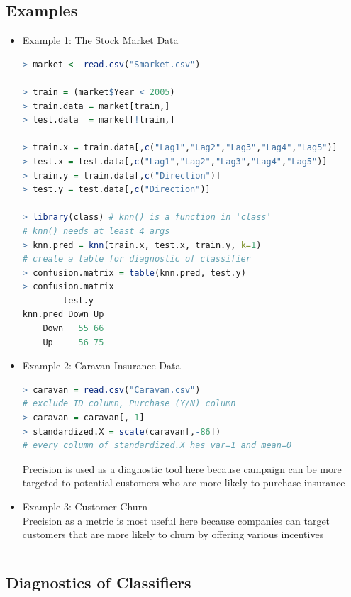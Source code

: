 \documentclass{article}
\begin{document}
\subsection{Examples}
\begin{itemize}
    \item Example 1: The Stock Market Data
\begin{lstlisting}[language=R]
> market <- read.csv("Smarket.csv")

> train = (market$Year < 2005)
> train.data = market[train,]
> test.data  = market[!train,]

> train.x = train.data[,c("Lag1","Lag2","Lag3","Lag4","Lag5")]
> test.x = test.data[,c("Lag1","Lag2","Lag3","Lag4","Lag5")]
> train.y = train.data[,c("Direction")]
> test.y = test.data[,c("Direction")]

> library(class) # knn() is a function in 'class'
# knn() needs at least 4 args
> knn.pred = knn(train.x, test.x, train.y, k=1)
# create a table for diagnostic of classifier
> confusion.matrix = table(knn.pred, test.y)
> confusion.matrix
        test.y
knn.pred Down Up
    Down   55 66
    Up     56 75
\end{lstlisting}
    \item Example 2: Caravan Insurance Data
\begin{lstlisting}[language=R]
> caravan = read.csv("Caravan.csv")
# exclude ID column, Purchase (Y/N) column
> caravan = caravan[,-1]
> standardized.X = scale(caravan[,-86])
# every column of standardized.X has var=1 and mean=0
\end{lstlisting}
Precision is used as a diagnostic tool here because campaign can be more targeted to potential customers who are more likely to purchase insurance
\item Example 3: Customer Churn\\
Precision as a metric is most useful here because companies can target customers that are more likely to churn by offering various incentives
\begin{lstlisting}[language=R]

\end{lstlisting}
    
\end{itemize}


\subsection{Diagnostics of Classifiers}
\end{document}
